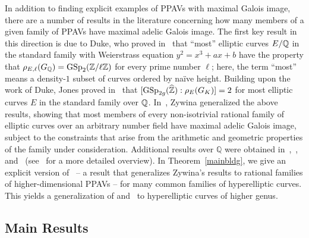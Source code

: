 In addition to finding explicit examples of PPAVs with maximal Galois image, there are a number of results in the literature concerning how many members of a given family of PPAVs have maximal adelic Galois image.
The first key result in this direction is due to Duke, who proved in~\cite{duke:elliptic-curves-with-no-exceptional-primes} that ``most'' elliptic curves $E/\mathbb Q$ in the standard family with Weierstrass equation $y^2 = x^3 + ax + b$ have the property that $\rho_{E,\ell}(G_{\mathbb Q}) = \operatorname{GSp}_2(\mathbb Z/\ell \mathbb Z)$ for every prime number $\ell$; here, the term ``most'' means a density-$1$ subset of curves ordered by na\"{i}ve height. Building upon the work of Duke, Jones proved in~\cite[Theorem 4]{josofabank} that $[\operatorname{GSp}_{2g}(\widehat{\mathbb Z}) : \rho_E(G_K)] = 2$ for most elliptic curves $E$ in the standard family over $\mathbb Q$.
In~\cite[Theorem 1.15]{zywina2010hilbert}, Zywina generalized 
the above results, showing that most members of every non-isotrivial rational family of elliptic curves over an arbitrary number field have maximal adelic Galois image, subject to the constraints that arise from the arithmetic and geometric properties of the family under consideration. 
Additional results over $\mathbb Q$ were
obtained in~\cite{grant:a-formula-for-the-number-of-elliptic-curves-with-exceptional-primes},~\cite{cojocaruH:uniform-results-for-serres-theorem-for-elliptic-curves}, and~\cite{cojocaruGJ:one-parameter-families-of-elliptic-curves}
(see~\cite[p.~6]{zywina2010hilbert} for a more detailed overview).
In Theorem~\ref{mainbldg}, we give an explicit version of~\cite[Theorem 1.1]{landesman-swaminathan-tao-xu:rational-families} -- a result that generalizes Zywina's results to rational families of higher-dimensional PPAVs --
for many common families of hyperelliptic curves.
This yields a generalization of \cite[Theorem 1.2]{zywina2010elliptic}
and~\cite[Theorem 4]{josofabank} to hyperelliptic curves of higher genus.

\subsection{Main Results}


